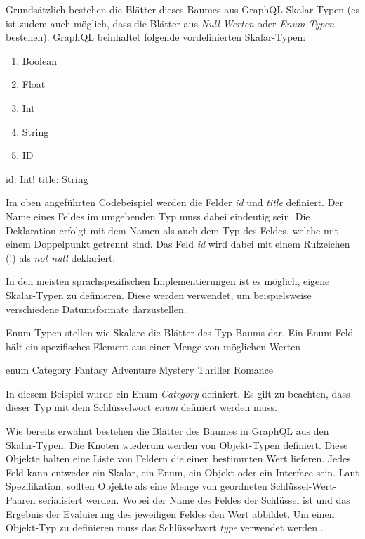 Grundsätzlich bestehen die Blätter dieses Baumes aus GraphQL-Skalar-Typen (es ist zudem auch möglich, dass die Blätter aus \textit{Null-Werten} oder \textit{Enum-Typen} bestehen).
\cite[Abs. ScalarTypeDefinition]{graphqlOnline}
GraphQL beinhaltet folgende vordefinierten Skalar-Typen:
\begin{enumerate}
    \item Boolean
    \item Float
    \item Int
    \item String
    \item ID
\end{enumerate}

\begin{JsCode}
    id: Int!
    title: String
\end{JsCode}

Im oben angeführten Codebeispiel werden die Felder \textit{id} und \textit{title} definiert.
Der Name eines Feldes im umgebenden Typ muss dabei eindeutig sein.
Die Deklaration erfolgt mit dem Namen als auch dem Typ des Feldes, welche mit einem Doppelpunkt getrennt sind.
Das Feld \textit{id} wird dabei mit einem Rufzeichen (!) als \textit{not null} deklariert.

In den meisten sprachspezifischen Implementierungen ist es möglich, eigene Skalar-Typen zu definieren. Diese werden verwendet, um beispielsweise verschiedene Datumsformate darzustellen.


Enum-Typen stellen wie Skalare die Blätter des Typ-Baums dar.
Ein Enum-Feld hält ein spezifisches Element aus einer Menge von möglichen Werten
\cite[Abs. 3.9]{graphqlOnline}
\cite[S. 60-61]{kress2020graphql}.

\begin{JsCode}
enum Category {
    Fantasy
    Adventure
    Mystery
    Thriller
    Romance
}
\end{JsCode}

In diesem Beispiel wurde ein Enum \textit{Category} definiert.
Es gilt zu beachten, dass dieser Typ mit dem Schlüsselwort \textit{enum} definiert werden muss.

Wie bereits erwähnt bestehen die Blätter des Baumes in GraphQL aus den Skalar-Typen.
Die Knoten wiederum werden von Objekt-Typen definiert.
Diese Objekte halten eine Liste von Feldern die einen bestimmten Wert lieferen.
Jedes Feld kann entweder ein Skalar, ein Enum, ein Objekt oder ein Interface sein.
Laut Spezifikation, sollten Objekte als eine Menge von geordneten Schlüssel-Wert-Paaren serialisiert werden.
Wobei der Name des Feldes der Schlüssel ist und das Ergebnis der Evaluierung des jeweiligen Feldes den Wert abbildet.
Um einen Objekt-Typ zu definieren muss das Schlüsselwort \textit{type} verwendet werden
\cite[Abs. 3.6]{graphqlOnline}.

